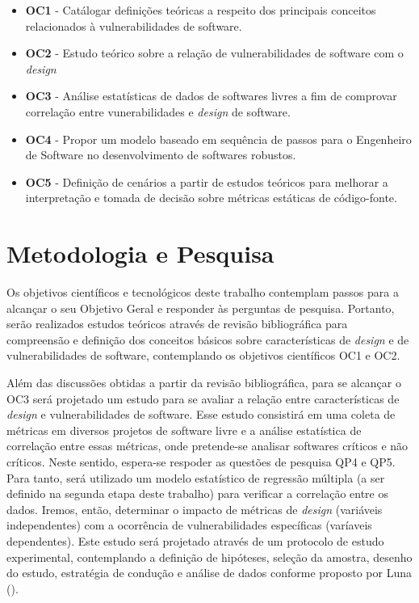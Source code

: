 	 	\begin{itemize}
			\item \textbf{OC1} - Catálogar definições teóricas a respeito dos principais conceitos relacionados à vulnerabilidades de software.
			\item \textbf{OC2} - Estudo teórico sobre a relação de vulnerabilidades de software com o \emph{design}
			\item \textbf{OC3} - Análise estatísticas de dados de softwares livres a fim de comprovar correlação entre vunerabilidades e \emph{design} de software.
			\item \textbf{OC4} - Propor um modelo baseado em sequência de passos para o Engenheiro de Software no desenvolvimento de softwares robustos.
			\item \textbf{OC5} - Definição de cenários a partir de estudos teóricos para melhorar a interpretação e tomada de decisão sobre métricas estáticas de código-fonte.
	 	\end{itemize}



\section{Metodologia e Pesquisa}

Os objetivos científicos e tecnológicos deste trabalho contemplam passos para a alcançar o seu Objetivo Geral e responder às perguntas de pesquisa. Portanto, serão realizados estudos teóricos através de revisão bibliográfica para compreensão e definição dos conceitos básicos sobre características de \emph{design}  e de vulnerabilidades de software, contemplando os objetivos científicos OC1 e OC2.

Além das discussões obtidas a partir da revisão bibliográfica, para se alcançar o OC3 será projetado um estudo para se avaliar a relação entre características de \emph{design} e vulnerabilidades de software.
%
Esse estudo consistirá em uma coleta de métricas em diversos projetos de software livre e a análise estatística de correlação entre essas métricas, onde pretende-se analisar softwares críticos e não críticos.
%
Neste sentido, espera-se respoder as questões de pesquisa QP4 e QP5. Para tanto, será utilizado um modelo estatístico de regressão múltipla (a ser definido na segunda etapa deste trabalho) para verificar a correlação entre os dados.
%
Iremos, então, determinar o impacto de métricas de \emph{design} (variáveis independentes) com a ocorrência de  vulnerabilidades específicas (varíaveis dependentes).
%
Este estudo será projetado através de um protocolo de estudo experimental, contemplando a definição de hipóteses, seleção da amostra, desenho do estudo, estratégia de condução e análise de dados conforme proposto por Luna (\citeyear{luna1998}).

